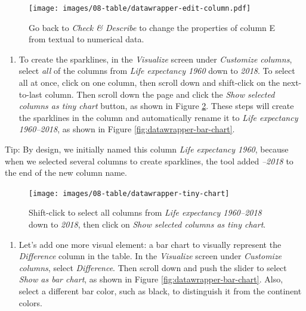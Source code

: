 \documentclass[
  english,
]{book}
\providecommand{\tightlist}{%
  \setlength{\itemsep}{0pt}\setlength{\parskip}{0pt}}
\begin{document}
\begin{figure}
\centering
\texttt{[image: images/08-table/datawrapper-edit-column.pdf]}
\caption{\label{fig:datawrapper-edit-column}Go back to \emph{Check \& Describe} to change the properties of column E from textual to numerical data.}
\end{figure}

\begin{enumerate}
\def\labelenumi{\arabic{enumi}.}
\setcounter{enumi}{10}
\tightlist
\item
  To create the sparklines, in the \emph{Visualize} screen under \emph{Customize columns}, select \emph{all} of the columns from \emph{Life expectancy 1960} down to \emph{2018}. To select all at once, click on one column, then scroll down and shift-click on the next-to-last column. Then scroll down the page and click the \emph{Show selected columns as tiny chart} button, as shown in Figure \ref{fig:datawrapper-tiny-chart}. These steps will create the sparklines in the column and automatically rename it to \emph{Life expectancy 1960--2018}, as shown in Figure \ref{fig:datawrapper-bar-chart}.
\end{enumerate}

Tip: By design, we initially named this column \emph{Life expectancy 1960}, because when we selected several columns to create sparklines, the tool added \emph{--2018} to the end of the new column name.



\begin{figure}
\texttt{[image: images/08-table/datawrapper-tiny-chart]} \caption{Shift-click to select all columns from \emph{Life expectancy 1960--2018} down to \emph{2018}, then click on \emph{Show selected columns as tiny chart}.}\label{fig:datawrapper-tiny-chart}
\end{figure}

\begin{enumerate}
\def\labelenumi{\arabic{enumi}.}
\setcounter{enumi}{11}
\tightlist
\item
  Let's add one more visual element: a bar chart to visually represent the \emph{Difference} column in the table. In the \emph{Visualize} screen under \emph{Customize columns}, select \emph{Difference}. Then scroll down and push the slider to select \emph{Show as bar chart}, as shown in Figure \ref{fig:datawrapper-bar-chart}. Also, select a different bar color, such as black, to distinguish it from the continent colors.
\end{enumerate}
\end{document}
